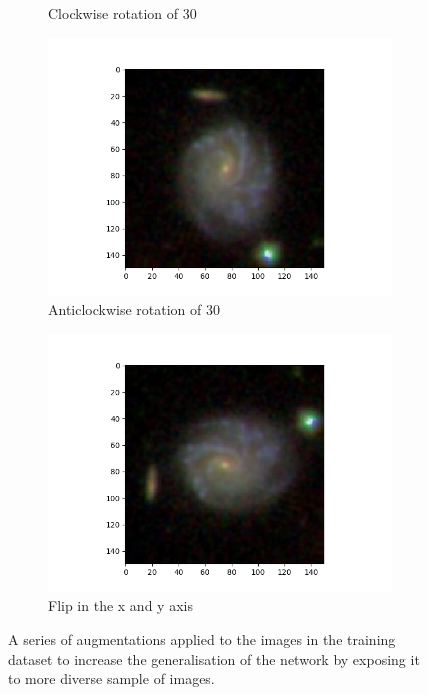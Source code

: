 \documentclass[12pt, onecolumn]{aa}
\begin{document}
\begin{figure}[h]
\begin{subfigure}[b]{0.5\linewidth}
    \caption{Clockwise rotation of 30\degree} \label{fig:dataug2}
  \end{subfigure} 
  \begin{subfigure}[b]{0.5\linewidth}
    \includegraphics[width=\linewidth]{Figures/rot_2_aug.png} 
    \caption{Anticlockwise rotation of 30\degree} \label{fig:dataug3}
  \end{subfigure}
  \hfill
  \begin{subfigure}[b]{0.5\linewidth}
    \includegraphics[width=\linewidth]{Figures/flip_aug.png} 
    \caption{Flip in the x and y axis} \label{fig:dataug4}
  \end{subfigure} 
    \caption{A series of augmentations applied to the images in the training dataset to increase the generalisation of the network by exposing it to more diverse sample of images.}
    \label{fig:dataug}
\end{figure}
\end{document}
